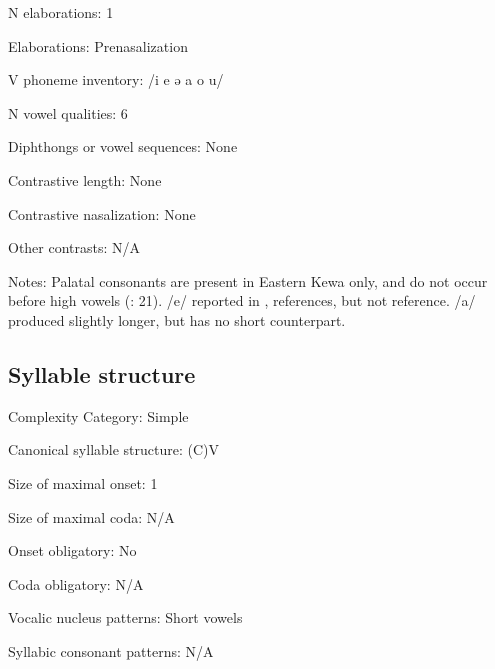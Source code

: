 {\begin{appendixdesc}
\item[N elaborations:] 1

\item[Elaborations:] Prenasalization

\item[V phoneme inventory:] /i e ə a o u/

\item[N vowel qualities:] 6

\item[Diphthongs or vowel sequences:] None

\item[Contrastive length:] None

\item[Contrastive nasalization:] None

\item[Other contrasts:] N/A

\item[Notes:] Palatal consonants are present in Eastern Kewa only, and do not occur before high vowels (\citealt{FranklinFranklin1978}: 21). /e/ reported in \citeyear{Franklin1971}, \citeyear{FranklinFranklin1978} references, but not \citeyear{FranklinFranklin1962} reference. /a/ produced slightly longer, but has no short counterpart.
\end{appendixdesc}
\subsection*{Syllable structure}
\begin{appendixdesc}

\item[Complexity Category:] Simple

\item[Canonical syllable structure:] (C)V \citep[11--12]{Franklin1971}

\item[Size of maximal onset:] 1

\item[Size of maximal coda:] N/A

\item[Onset obligatory:] No

\item[Coda obligatory:] N/A

\item[Vocalic nucleus patterns:] Short vowels

\item[Syllabic consonant patterns:] N/A


\end{appendixdesc}}
